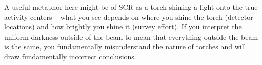 \documentclass[useAMS,usenatbib,referee]{biom}
\begin{document}
A useful metaphor here might be of SCR as a torch shining a light onto the true activity centers -- what you see depends on where you shine the torch (detector locations) and how brightly you shine it (survey effort). If you interpret the uniform darkness outside of the beam to mean that everything outside the beam is the same, you fundamentally misunderstand the nature of torches and will draw fundamentally incorrect conclusions.





\end{document}
